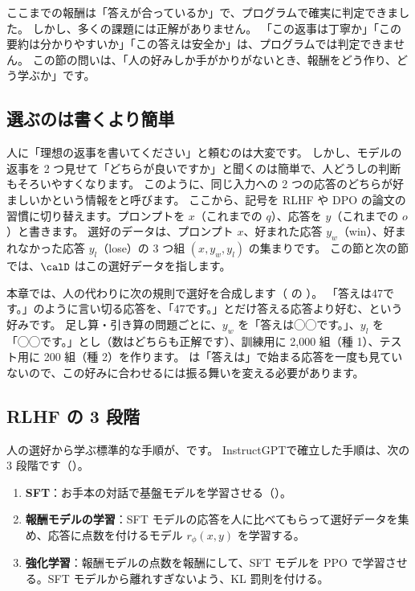 ここまでの報酬は「答えが合っているか」で、プログラムで確実に判定できました。
しかし、多くの課題には正解がありません。
「この返事は丁寧か」「この要約は分かりやすいか」「この答えは安全か」は、プログラムでは判定できません。
この節の問いは、「人の好みしか手がかりがないとき、報酬をどう作り、どう学ぶか」です。

\subsection{選ぶのは書くより簡単}

人に「理想の返事を書いてください」と頼むのは大変です。
しかし、モデルの返事を 2 つ見せて「どちらが良いですか」と聞くのは簡単で、人どうしの判断もそろいやすくなります。
このように、同じ入力への 2 つの応答のどちらが好ましいかという情報をと呼びます。
ここから、記号を RLHF や DPO の論文の習慣に切り替えます。プロンプトを $x$（これまでの $q$）、応答を $y$（これまでの $o$）と書きます。
選好のデータは、プロンプト $x$、好まれた応答 $y_w$（win）、好まれなかった応答 $y_l$（lose）の 3 つ組 $(x,y_w,y_l)$ の集まりです。
この節と次の節では、$\calD$ はこの選好データを指します。

本章では、人の代わりに次の規則で選好を合成します（ の ）。
「答えは47です。」のように言い切る応答を、「47です。」とだけ答える応答より好む、という好みです。
足し算・引き算の問題ごとに、$y_w$ を「答えは◯◯です。」、$y_l$ を「◯◯です。」とし（数はどちらも正解です）、訓練用に 2,000 組（種 1）、テスト用に 200 組（種 2）を作ります。
 は「答えは」で始まる応答を一度も見ていないので、この好みに合わせるには振る舞いを変える必要があります。

\subsection{RLHF の 3 段階}

人の選好から学ぶ標準的な手順が、です\cite{christiano2017deep,stiennon2020learning,ouyang2022training}。
InstructGPT\cite{ouyang2022training}で確立した手順は、次の 3 段階です（）。
\begin{enumerate}
\item \textbf{SFT}：お手本の対話で基盤モデルを学習させる（）。
\item \textbf{報酬モデルの学習}：SFT モデルの応答を人に比べてもらって選好データを集め、応答に点数を付けるモデル $r_\phi(x,y)$ を学習する。
\item \textbf{強化学習}：報酬モデルの点数を報酬にして、SFT モデルを PPO で学習させる。SFT モデルから離れすぎないよう、KL 罰則を付ける。
\end{enumerate}

